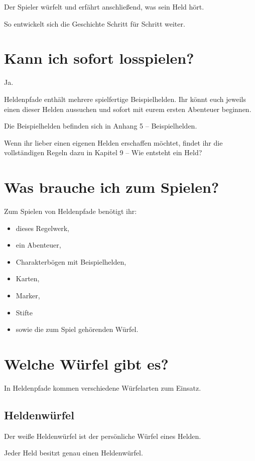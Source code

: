 Der Spieler würfelt und erfährt anschließend, was sein Held hört.

So entwickelt sich die Geschichte Schritt für Schritt weiter.

\section{Kann ich sofort losspielen?}

Ja.

Heldenpfade enthält mehrere spielfertige Beispielhelden. Ihr könnt euch jeweils einen dieser Helden aussuchen und sofort mit eurem ersten Abenteuer beginnen.

Die Beispielhelden befinden sich in Anhang 5 -- Beispielhelden.

Wenn ihr lieber einen eigenen Helden erschaffen möchtet, findet ihr die vollständigen Regeln dazu in Kapitel 9 -- Wie entsteht ein Held?

\section{Was brauche ich zum Spielen?}

Zum Spielen von Heldenpfade benötigt ihr:

\begin{itemize}
  \item dieses Regelwerk,
  \item ein Abenteuer,
  \item Charakterbögen mit Beispielhelden,
  \item Karten,
  \item Marker,
  \item Stifte
  \item sowie die zum Spiel gehörenden Würfel.
\end{itemize}

\section{Welche Würfel gibt es?}

In Heldenpfade kommen verschiedene Würfelarten zum Einsatz.

\subsection*{Heldenwürfel}

Der weiße Heldenwürfel ist der persönliche Würfel eines Helden.

Jeder Held besitzt genau einen Heldenwürfel.

